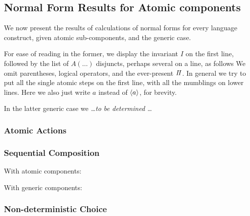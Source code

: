 \subsection{Normal Form Results for Atomic components}

We now present the results of calculations of normal forms for every language
construct, given atomic sub-components,
and the generic case.

For ease of reading in the former,
we display the invariant $I$ on the first line,
followed by the list of $A(\dots)$ disjuncts, perhaps several on a line,
as follows
We omit parentheses, logical operators, and the ever-present $I\!I$.
In general we try to put all the single atomic steps on the first line,
with all the mumblings on lower lines.
Here we also just write $a$ instead of $\langle a\rangle$,
for brevity.

In the latter generic case we  \emph{\dots to be determined \dots}

\subsubsection{Atomic Actions}

\subsubsection{Sequential Composition}

With atomic components:

With generic components:


\subsubsection{Non-deterministic Choice}



